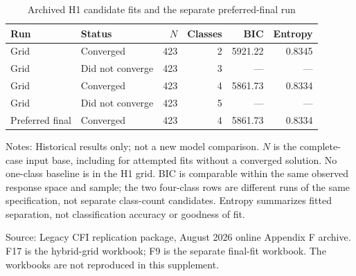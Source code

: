 \begin{table}[tbp]
\centering\small
\caption{Archived H1 candidate fits and the separate preferred-final run}
\label{tab:historical-h1}
\begin{tabular}{@{}llrrrr@{}}
\toprule
Run & Status & \(N\) & Classes & BIC & Entropy \\
\midrule
Grid & Converged & 423 & 2 & 5921.22 & 0.8345 \\
Grid & Did not converge & 423 & 3 & --- & --- \\
Grid & Converged & 423 & 4 & 5861.73 & 0.8334 \\
Grid & Did not converge & 423 & 5 & --- & --- \\
\addlinespace
Preferred final & Converged & 423 & 4 & 5861.73 & 0.8334 \\
\bottomrule
\end{tabular}
\par\smallskip
\begin{minipage}{.94\linewidth}
\footnotesize\raggedright
Notes: Historical results only; not a new model comparison. \(N\) is the complete-case input base, including for attempted fits without a converged solution. No one-class baseline is in the H1 grid. BIC is comparable within the same observed response space and sample; the two four-class rows are different runs of the same specification, not separate class-count candidates. Entropy summarizes fitted separation, not classification accuracy or goodness of fit.\par
Source: Legacy CFI replication package, August 2026 online Appendix F archive. F17 is the hybrid-grid workbook; F9 is the separate final-fit workbook. The workbooks are not reproduced in this supplement.
\end{minipage}
\end{table}
